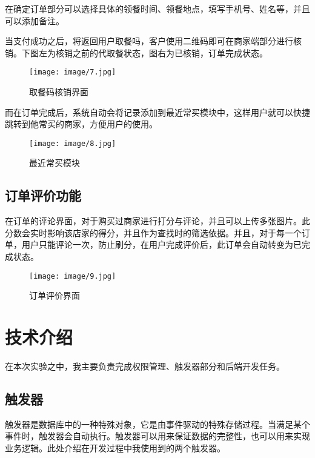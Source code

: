 \documentclass[lang=cn,a4paper,chinesefont=founder,bibend=bibtex]{shu-lab-report}
\begin{document}
在确定订单部分可以选择具体的领餐时间、领餐地点，填写手机号、姓名等，并且可以添加备注。

当支付成功之后，将返回用户取餐吗，客户使用二维码即可在商家端部分进行核销。下图左为核销之前的代取餐状态，图右为已核销，订单完成状态。

\begin{figure}[htbp]
  \centering
  \texttt{[image: image/7.jpg]}
  \caption{取餐码核销界面}
\end{figure}

而在订单完成后，系统自动会将记录添加到最近常买模块中，这样用户就可以快捷跳转到他常买的商家，方便用户的使用。

\begin{figure}[htbp]
  \centering
  \texttt{[image: image/8.jpg]}
  \caption{最近常买模块}
\end{figure}

\subsection{订单评价功能}

在订单的评论界面，对于购买过商家进行打分与评论，并且可以上传多张图片。此分数会实时影响该店家的得分，并且作为查找时的筛选依据。并且，对于每一个订单，用户只能评论一次，防止刷分，在用户完成评价后，此订单会自动转变为已完成状态。

\begin{figure}[htbp]
  \centering
  \texttt{[image: image/9.jpg]}
  \caption{订单评价界面}
\end{figure}

\section{技术介绍}

\begin{tcolorbox}[colback=orange!5!white,colframe=orange!75!black]
  在本次实验之中，我主要负责完成权限管理、触发器部分和后端开发任务。
\end{tcolorbox}

\subsection{触发器}

触发器是数据库中的一种特殊对象，它是由事件驱动的特殊存储过程。当满足某个事件时，触发器会自动执行。触发器可以用来保证数据的完整性，也可以用来实现业务逻辑。此处介绍在开发过程中我使用到的两个触发器。
\end{document}
